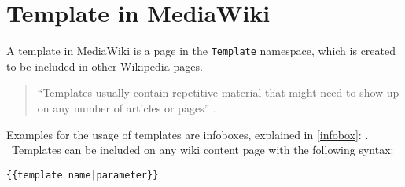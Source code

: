 \section{Template in MediaWiki}

A template in MediaWiki is a page in the \texttt{\justify Template} namespace, which is created to be included in other Wikipedia pages. 
\begin{quote}
``Templates usually contain repetitive material that might need to show up on any number of articles or pages'' \citep{wiki:21}. 
\end{quote}
Examples for the usage of templates are infoboxes, explained in \ref{infobox}: . \\\
Templates can be included on any wiki content page with the following syntax:
\begin{lstlisting}[frame=single] 
{{template name|parameter}}
\end{lstlisting}